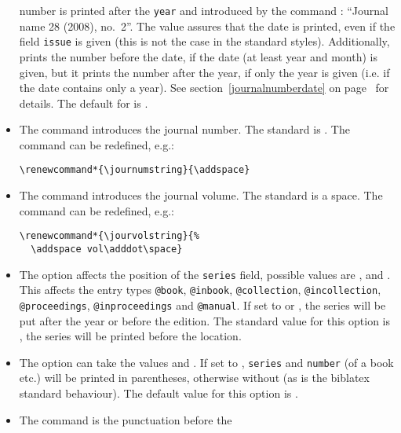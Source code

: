 \documentclass[english]{scrartcl}
\begin{document}
\begin{itemize}
	      number is printed after the \texttt{year} and introduced by the
	      command : \enquote{Journal name 28 (2008), no.~2}.
	      The value  assures that the date is printed, even if the 
	      field \texttt{issue} is given (this is not the case in the standard
	      styles).
	      Additionally,  prints the number before the
	      date, if the date (at least year and month) is given, but it prints
	      the number after the year, if only the year is given (i.e. if the date
	      contains only a year). See section~\ref{journalnumberdate} on
	      page~\pageref{journalnumberdate} for details. The default for
	       is .	      
	\item The command  introduces the journal number.
	      The standard is . The command can be redefined,
	      e.g.:
	      \begin{lstlisting}
\renewcommand*{\journumstring}{\addspace}
				\end{lstlisting}
	\item The command  introduces the journal volume.
	      The standard is a space. The command can be redefined, e.g.:
				\begin{lstlisting}
\renewcommand*{\jourvolstring}{%
  \addspace vol\adddot\space}
				\end{lstlisting}
  \item The option  affects the position of the \texttt{series}
        field, possible values are ,  and . This affects the entry types \texttt{@book}, \texttt{@inbook},
        \texttt{@collection}, \texttt{@incollection}, \texttt{@proceedings},
        \texttt{@inproceedings} and \texttt{@manual}. 
        If set to  or , the series will be put after the year or before the edition.
        The standard value for this option is , the series will be printed before the location.
	\item The option  can 
        take the values  and . If set to 
        , \texttt{series} and \texttt{number} (of a book etc.)
        will be printed in parentheses, otherwise without (as is the biblatex 
        standard behaviour). The default value for this option is .
  \item The command  is the punctuation before the 

\end{itemize}
\end{document}
